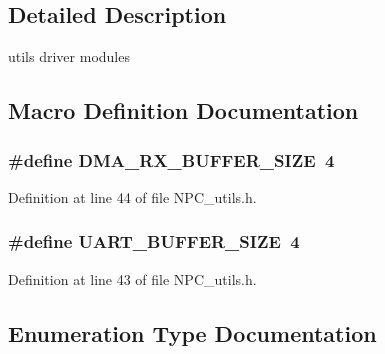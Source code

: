 \subsection{Detailed Description}
utils driver modules 



\subsection{Macro Definition Documentation}
\subsubsection[{\texorpdfstring{D\+M\+A\+\_\+\+R\+X\+\_\+\+B\+U\+F\+F\+E\+R\+\_\+\+S\+I\+ZE}{DMA_RX_BUFFER_SIZE}}]{\setlength{\rightskip}{0pt plus 5cm}\#define D\+M\+A\+\_\+\+R\+X\+\_\+\+B\+U\+F\+F\+E\+R\+\_\+\+S\+I\+ZE~4}\hypertarget{group___utils_ga2345ec0af8fc8a1782768a22a15a4ad3}{}\label{group___utils_ga2345ec0af8fc8a1782768a22a15a4ad3}


Definition at line 44 of file N\+P\+C\+\_\+utils.\+h.

\subsubsection[{\texorpdfstring{U\+A\+R\+T\+\_\+\+B\+U\+F\+F\+E\+R\+\_\+\+S\+I\+ZE}{UART_BUFFER_SIZE}}]{\setlength{\rightskip}{0pt plus 5cm}\#define U\+A\+R\+T\+\_\+\+B\+U\+F\+F\+E\+R\+\_\+\+S\+I\+ZE~4}\hypertarget{group___utils_ga0d57378e32bf8278011460740bc29f7f}{}\label{group___utils_ga0d57378e32bf8278011460740bc29f7f}


Definition at line 43 of file N\+P\+C\+\_\+utils.\+h.



\subsection{Enumeration Type Documentation}
